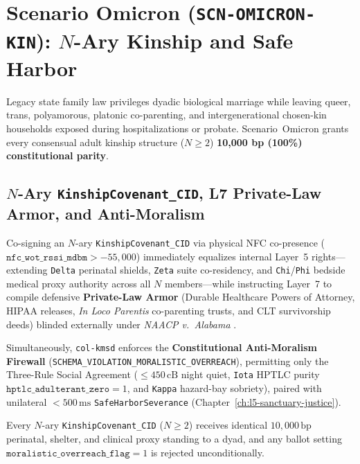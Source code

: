 \section{Scenario Omicron (\texttt{SCN-OMICRON-KIN}): $N$-Ary Kinship and Safe Harbor}
\label{sec:wavec-omicron}

Legacy state family law privileges dyadic biological marriage while leaving queer, trans,
polyamorous, platonic co-parenting, and intergenerational chosen-kin households exposed during
hospitalizations or probate. Scenario~Omicron grants every consensual adult kinship structure
($N \ge 2$) \textbf{10,000 bp (100\%) constitutional parity}.

\subsection{$N$-Ary \texttt{KinshipCovenant\_CID}, L7 Private-Law Armor, and Anti-Moralism}

Co-signing an $N$-ary \texttt{KinshipCovenant\_CID} via physical NFC co-presence
($\mathtt{nfc\_wot\_rssi\_mdbm} > -55{,}000$) immediately equalizes internal Layer~5 rights---extending
\texttt{Delta} perinatal shields, \texttt{Zeta} suite co-residency, and \texttt{Chi}/\texttt{Phi}
bedside medical proxy authority across all $N$ members---while instructing Layer~7 to compile
defensive \textbf{Private-Law Armor} (Durable Healthcare Powers of Attorney, HIPAA releases,
\textit{In Loco Parentis} co-parenting trusts, and CLT survivorship deeds) blinded externally under
\textit{NAACP v.\ Alabama} \parencite{naacp1958}.

Simultaneously, \texttt{col-kmsd} enforces the \textbf{Constitutional Anti-Moralism Firewall}
(\texttt{SCHEMA\_VIOLATION\_MORALISTIC\_OVERREACH}), permitting only the Three-Rule Social Agreement
($\le 450\,\mathrm{cB}$ night quiet, \texttt{Iota} HPTLC purity $\mathtt{hptlc\_adulterant\_zero} = 1$,
and \texttt{Kappa} hazard-bay sobriety), paired with unilateral $< 500\,\mathrm{ms}$
\texttt{SafeHarborSeverance} (Chapter~\ref{ch:l5-sanctuary-justice}).

\begin{invariant}
\label{inv:wavec-omicron-parity}
Every $N$-ary \texttt{KinshipCovenant\_CID} ($N \ge 2$) receives identical $10{,}000\,\mathrm{bp}$
perinatal, shelter, and clinical proxy standing to a dyad, and any ballot setting
$\mathtt{moralistic\_overreach\_flag} = 1$ is rejected unconditionally.
\end{invariant}

